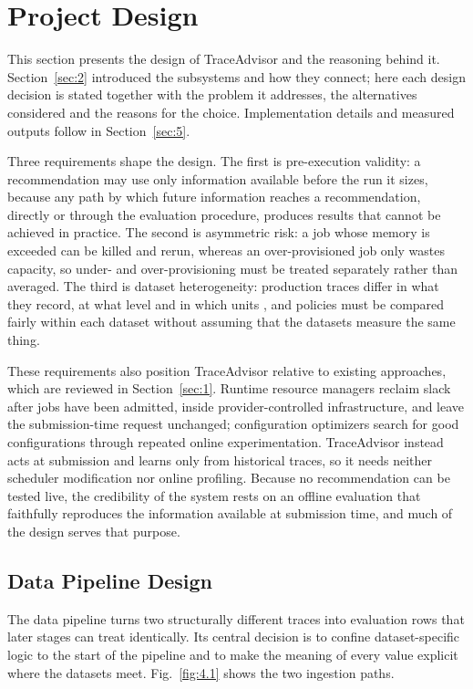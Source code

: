 \section{Project Design}\label{sec:4}

This section presents the design of TraceAdvisor and the reasoning behind it. Section~\ref{sec:2} introduced the subsystems and how they connect; here each design decision is stated together with the problem it addresses, the alternatives considered and the reasons for the choice. Implementation details and measured outputs follow in Section~\ref{sec:5}.

Three requirements shape the design. The first is pre-execution validity: a recommendation may use only information available before the run it sizes, because any path by which future information reaches a recommendation, directly or through the evaluation procedure, produces results that cannot be achieved in practice. The second is asymmetric risk: a job whose memory is exceeded can be killed and rerun, whereas an over-provisioned job only wastes capacity, so under- and over-provisioning must be treated separately rather than averaged. The third is dataset heterogeneity: production traces differ in what they record, at what level and in which units \cite{ref7,ref19}, and policies must be compared fairly within each dataset without assuming that the datasets measure the same thing.

These requirements also position TraceAdvisor relative to existing approaches, which are reviewed in Section~\ref{sec:1}. Runtime resource managers reclaim slack after jobs have been admitted, inside provider-controlled infrastructure, and leave the submission-time request unchanged; configuration optimizers search for good configurations through repeated online experimentation. TraceAdvisor instead acts at submission and learns only from historical traces, so it needs neither scheduler modification nor online profiling. Because no recommendation can be tested live, the credibility of the system rests on an offline evaluation that faithfully reproduces the information available at submission time, and much of the design serves that purpose.

\subsection{Data Pipeline Design}\label{sec:4.1}

The data pipeline turns two structurally different traces into evaluation rows that later stages can treat identically. Its central decision is to confine dataset-specific logic to the start of the pipeline and to make the meaning of every value explicit where the datasets meet. Fig.~\ref{fig:4.1} shows the two ingestion paths.

